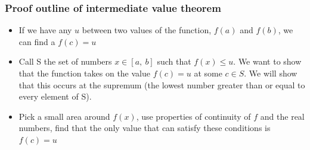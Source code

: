 \documentclass[handout]{beamer}
\numberwithin{equation}{section}
\begin{document}
\begin{frame}
\frametitle{Proof outline of intermediate value theorem}
\begin{itemize}
\item If we have any $u$ between two values of the function, $f(a)$ and $f(b)$, we can find a $f(c)=u$
\item Call S the set of numbers $x\in [a,\ b]$ such that $f(x)\leq u$.  We want to show that the function takes on the value $f(c)=u$ at some $c \in S$.  We will show that this occurs at the supremum (the lowest number greater than or equal to every element of S). 
\item Pick a small area around $f(x)$, use properties of continuity of $f$ and the real numbers, find that the only value that can satisfy these conditions is $f(c)=u$
\end{itemize}

\end{frame}
\end{document}
